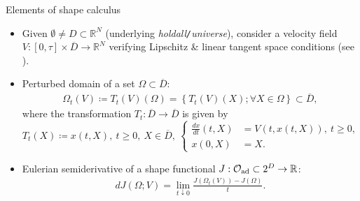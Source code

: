 \documentclass[10pt
hyperref={
    pdfauthor={Hong Quan Ba Nguyen},
    pdftitle={Optimal Shape Design of Air Ducts in Combustion Engines: Design a General Framework},
    pdfsubject={Talk},
    pdfcreator={LaTeX},
}
]{beamer}
\begin{document}
\begin{frame}{Elements of shape calculus}
    \begin{itemize}
        \item Given $\emptyset\ne D\subset\mathbb{R}^N$ (underlying \textit{holdall\texttt{/}universe}), consider a velocity field $V:[0,\tau]\times\overline{D}\to\mathbb{R}^N$ verifying Lipschitz {\small\&} linear tangent space conditions (see \cite{DZ2011}).
        \item Perturbed domain of a set $\Omega\subset\overline{D}$:
        \begin{align*}
            \Omega_t(V)\coloneqq T_t(V)(\Omega) = \left\{T_t(V)(X);\forall X\in\Omega\right\}\subset\overline{D},
        \end{align*}
        where the transformation $T_t:\overline{D}\to\overline{D}$ is given by
        \begin{equation*}
            T_t(X)\coloneqq x(t,X),\ t\ge 0,\ X\in\overline{D},\ \left\{\begin{split}
                \frac{dx}{dt}(t,X) &= V(t,x(t,X)),\ t\ge 0,\\
                x(0,X) &= X.
            \end{split}\right.
        \end{equation*}
        \item Eulerian semiderivative of a shape functional $J:\mathcal{O}_{\rm ad}\subset 2^D\to\mathbb{R}$:
        \begin{align*}
            dJ(\Omega;V) = \lim_{t\downarrow 0} \frac{J(\Omega_t(V)) - J(\Omega)}{t}.
        \end{align*}
    \end{itemize}
\end{frame}
\end{document}
